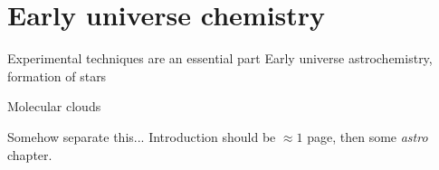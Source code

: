 
\section{Early universe chemistry}

Experimental techniques are an essential part
Early universe astrochemistry, formation of stars

Molecular clouds

Somehow separate this... Introduction should be $\approx1$ page, then some {\em astro} chapter.

\endgroup
